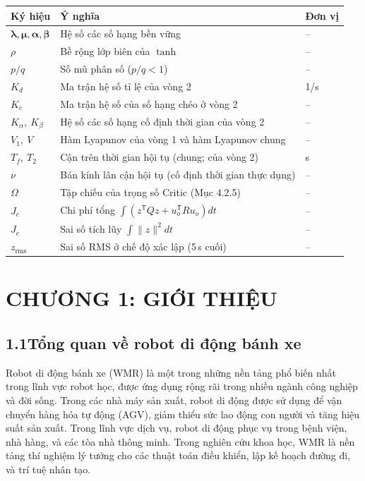 \documentclass[12pt,a4paper]{article}
\newcommand{\chapternum}{0}
\newcommand{\setchapter}[1]{%
  \renewcommand{\chapternum}{#1}%
  \setcounter{figure}{0}%
  \setcounter{table}{0}%
  \setcounter{equation}{0}%
  \renewcommand{\thefigure}{\chapternum.\arabic{figure}}%
  \renewcommand{\thetable}{\chapternum.\arabic{table}}%
  \renewcommand{\theequation}{\chapternum.\arabic{equation}}%
  \renewcommand{\theHfigure}{\chapternum.\arabic{figure}}%
  \renewcommand{\theHtable}{\chapternum.\arabic{table}}%
  \renewcommand{\theHequation}{\chapternum.\arabic{equation}}%
  \setcounter{dinhly}{0}\setcounter{bode}{0}\setcounter{hequa}{0}%
  \def\theHdinhly{\chapternum.\arabic{dinhly}}%
  \def\theHbode{\chapternum.\arabic{bode}}%
  \def\theHhequa{\chapternum.\arabic{hequa}}%
}
\newcommand{\T}{\mathsf{T}}
\begin{document}
\begin{table}[H]
\centering
\small
\begin{tabular}{lll}
\toprule
\textbf{Ký hiệu} & \textbf{Ý nghĩa} & \textbf{Đơn vị} \\
\midrule
$\bm{\lambda}, \bm{\mu}, \bm{\alpha}, \bm{\beta}$ & Hệ số các số hạng bền vững & -- \\
$\rho$ & Bề rộng lớp biên của $\tanh$ & -- \\
$p/q$ & Số mũ phân số ($p/q < 1$) & -- \\
$K_d$ & Ma trận hệ số tỉ lệ của vòng 2 & 1/s \\
$K_c$ & Ma trận hệ số của số hạng chéo ở vòng 2 & -- \\
$K_\alpha,\ K_\beta$ & Hệ số các số hạng cố định thời gian của vòng 2 & -- \\
$V_1,\ V$ & Hàm Lyapunov của vòng 1 và hàm Lyapunov chung & -- \\
$T_f,\ T_2$ & Cận trên thời gian hội tụ (chung; của vòng 2) & s \\
$\nu$ & Bán kính lân cận hội tụ (cố định thời gian thực dụng) & -- \\
$\Omega$ & Tập chiếu của trọng số Critic (Mục 4.2.5) & -- \\
\midrule
$J_c$ & Chi phí tổng $\int (z^\T Qz + u_o^\T Ru_o) dt$ & -- \\
$J_e$ & Sai số tích lũy $\int \|z\|^2 dt$ & -- \\
$z_\text{rms}$ & Sai số RMS ở chế độ xác lập (5\,s cuối) & -- \\
\bottomrule
\end{tabular}
\end{table}

\newpage
{}
\setchapter{1}
\section*{CHƯƠNG 1: GIỚI THIỆU}

\subsection*{1.1\quad Tổng quan về robot di động bánh xe}

Robot di động bánh xe (WMR) là một trong những nền tảng phổ biến nhất trong lĩnh vực robot học, được ứng dụng rộng rãi trong nhiều ngành công nghiệp và đời sống. Trong các nhà máy sản xuất, robot di động được sử dụng để vận chuyển hàng hóa tự động (AGV), giảm thiểu sức lao động con người và tăng hiệu suất sản xuất. Trong lĩnh vực dịch vụ, robot di động phục vụ trong bệnh viện, nhà hàng, và các tòa nhà thông minh. Trong nghiên cứu khoa học, WMR là nền tảng thí nghiệm lý tưởng cho các thuật toán điều khiển, lập kế hoạch đường đi, và trí tuệ nhân tạo.
\end{document}
